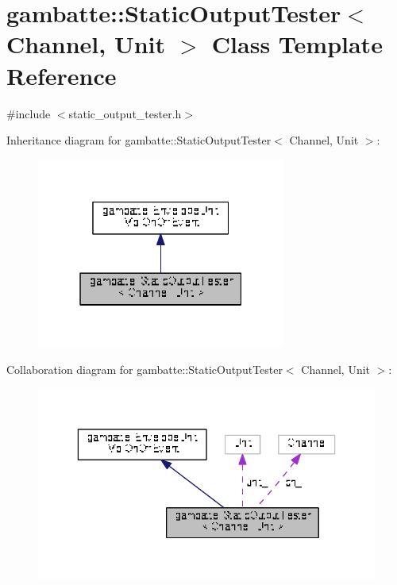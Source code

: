 \hypertarget{classgambatte_1_1StaticOutputTester}{}\section{gambatte\+:\+:Static\+Output\+Tester$<$ Channel, Unit $>$ Class Template Reference}
\label{classgambatte_1_1StaticOutputTester}


{\ttfamily \#include $<$static\+\_\+output\+\_\+tester.\+h$>$}



Inheritance diagram for gambatte\+:\+:Static\+Output\+Tester$<$ Channel, Unit $>$\+:\nopagebreak
\begin{figure}[H]
\begin{center}
\leavevmode
\includegraphics[width=232pt]{classgambatte_1_1StaticOutputTester__inherit__graph}
\end{center}
\end{figure}


Collaboration diagram for gambatte\+:\+:Static\+Output\+Tester$<$ Channel, Unit $>$\+:
\nopagebreak
\begin{figure}[H]
\begin{center}
\leavevmode
\includegraphics[width=336pt]{classgambatte_1_1StaticOutputTester__coll__graph}
\end{center}
\end{figure}

